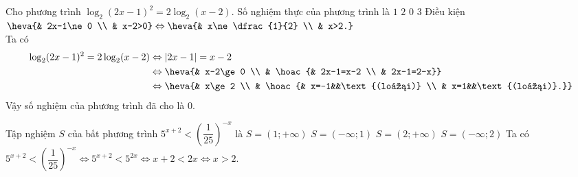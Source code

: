 \begin{ex}%
Cho phương trình $\log_2(2x-1)^2=2\log_2(x-2)$. Số nghiệm thực của phương trình là
\choice
{$1$}
{$2$}
{\True $0$}
{$3$}
\loigiai
{
Điều kiện $\heva{& 2x-1\ne 0 \\ & x-2>0}\Leftrightarrow \heva{& x\ne \dfrac{1}{2} \\ & x>2.}$\\
Ta có
\begin{align*}
\log_2(2x-1)^2=2\log_2(x-2)&\Leftrightarrow |2x-1|=x-2\\
&\Leftrightarrow \heva{& x-2\ge 0 \\ & \hoac{& 2x-1=x-2 \\ & 2x-1=2-x}}\\
&\Leftrightarrow \heva{& x\ge 2 \\ & \hoac{& x=-1&&\text{(loại)} \\ & x=1&&\text{(loại)}.}}
\end{align*}
Vậy số nghiệm của phương trình đã cho là $0$.
}
\end{ex}

\begin{ex}%
Tập nghiệm $S$ của bất phương trình $5^{x+2}<\left(\dfrac{1}{25}\right)^{-x}$ là
\choice
{$S=(1;+\infty)$}
{$S=(-\infty;1)$}
{\True $S=(2;+\infty)$}
{$S=(-\infty;2)$}
\loigiai
{
Ta có $5^{x+2}<\left(\dfrac{1}{25}\right)^{-x}\Leftrightarrow 5^{x+2}<5^{2x}\Leftrightarrow x+2<2x\Leftrightarrow x>2$.
}
\end{ex}


